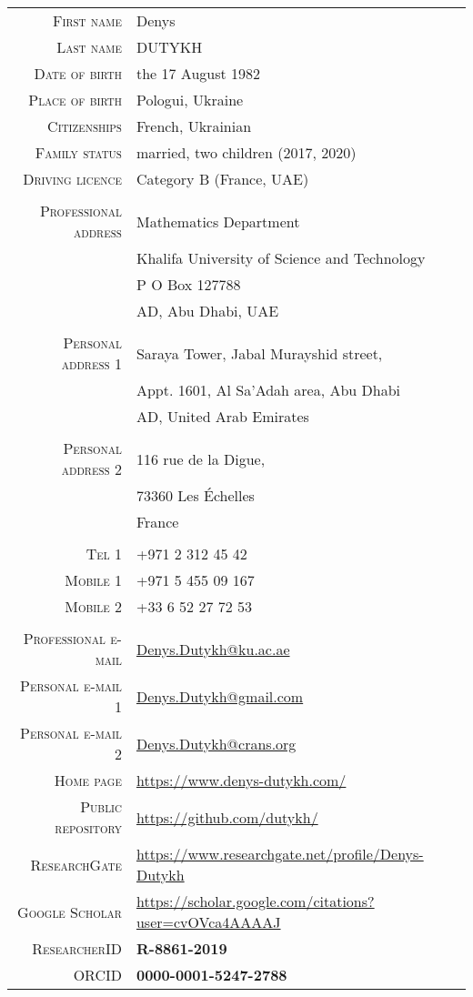 \documentclass[final, a4paper, oneside, 12pt]{article}
\numberwithin{equation}{section}
\begin{document}
    \begin{tabular}{rl}
      \textsc{First name} & Denys \\
      \textsc{Last name} & \textsc{DUTYKH} \\
      \textsc{Date of birth} & the 17\up{th} August 1982 \\
      \textsc{Place of birth} & Pologui, Ukraine \\
      \textsc{Citizenships} & French, Ukrainian \\
      \textsc{Family status} & married, two children (2017, 2020) \\
      \textsc{Driving licence} & Category B (France, UAE) \\
      & \\
      \textsc{Professional address} & Mathematics Department \\
      & Khalifa University of Science and Technology \\
      & P O Box 127788 \\
      & AD, Abu Dhabi, UAE \\
      & \\
      \textsc{Personal address 1} & Saraya Tower, Jabal Murayshid street, \\
      & Appt. 1601, Al Sa'Adah area, Abu Dhabi \\
      & AD, United Arab Emirates \\
      & \\
      \textsc{Personal address 2} & 116 rue de la Digue, \\
      & 73360 Les \'Echelles \\
      & France \\
      & \\
      \textsc{Tel 1} &    +971 2  312 45 42 \\
      \textsc{Mobile 1} & +971 5  455 09 167 \\
      \textsc{Mobile 2} & +33  6  52 27 72 53 \\
      & \\
      \textsc{Professional e-mail} &
       \href{mailto:Denys.Dutykh@ku.ac.ae}{Denys.Dutykh@ku.ac.ae} \\
      \textsc{Personal e-mail 1} &
       \href{mailto:Denys.Dutykh@gmail.com}{Denys.Dutykh@gmail.com} \\
      \textsc{Personal e-mail 2} &
       \href{mailto:Denys.Dutykh@crans.org}{Denys.Dutykh@crans.org} \\
      \textsc{Home page} & \url{https://www.denys-dutykh.com/} \\
      \textsc{Public repository} & \url{https://github.com/dutykh/} \\
      \textsc{ResearchGate} & \url{https://www.researchgate.net/profile/Denys-Dutykh} \\
      \textsc{Google Scholar} & \url{https://scholar.google.com/citations?user=cvOVca4AAAAJ} \\
      \textsc{ResearcherID} & \textbf{R-8861-2019} \\
      \textsc{ORCID} & \textbf{0000-0001-5247-2788} \\
    \end{tabular}
    
\end{document}
